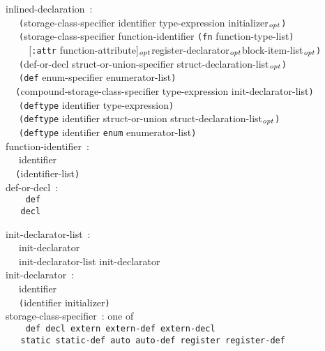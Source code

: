 \documentclass[a4]{article}
\def\|{\verb|} %|
\newcommand{\opt}{$_{{\it opt}}$}
\begin{document}
\noindent
inlined-declaration{\rm \ :} \\
\|  | {\tt (}storage-class-specifier identifier type-expression initializer\opt{\tt )} \\
\|  | {\tt (}storage-class-specifier function-identifier {\tt (fn} function-type-list{\tt )}\\
\|    | {\rm [}{\tt :attr} function-attribute{\rm ]}\opt register-declarator\opt block-item-list\opt{\tt )} \\ 
\|  | {\tt (}def-or-decl struct-or-union-specifier struct-declaration-list\opt{\tt )} \\
\|  | {\tt (def} enum-specifier enumerator-list{\tt )} \\
\|  | {\tt (}compound-storage-class-specifier type-expression init-declarator-list{\tt )} \\
\|  | {\tt (deftype} identifier type-expression{\tt )} \\
\|  | {\tt (deftype} identifier struct-or-union struct-declaration-list\opt{\tt )} \\
\|  | {\tt (deftype} identifier {\tt enum} enumerator-list{\tt )} \\

\noindent
function-identifier{\rm \ :} \\
\|  | identifier \\
\|  | {\tt (}identifier-list{\tt )} \\

\noindent
def-or-decl{\rm \ :} \\ \tt
\|  | def \\
\|  | decl \\ \it

\noindent
init-declarator-list{\rm \ :} \\
\|  | init-declarator \\
\|  | init-declarator-list init-declarator \\ 

\noindent
init-declarator{\rm \ :} \\
\|  | identifier \\
\|  | {\tt (}identifier initializer{\tt )} \\ 

\noindent
storage-class-specifier{\rm \ :} {\rm one of} \\  \tt
\|  | def decl extern extern-def extern-decl\\
\|  | static static-def auto auto-def register register-def \\ \it
\end{document}
